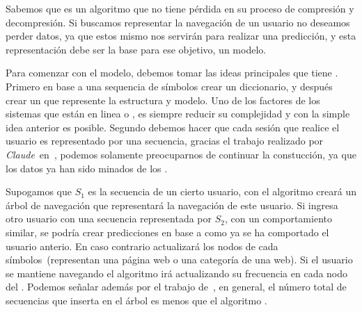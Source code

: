 % 
% 




Sabemos que \lzSieteOcho es un algoritmo que no tiene pérdida en su proceso de compresión y decompresión. Si buscamos representar la navegación de un usuario no deseamos perder datos, ya que estos mismo nos servirán para realizar una predicción, y esta representación debe ser la base para ese objetivo, un modelo.

Para comenzar con el modelo, debemos tomar las ideas principales que tiene \lzSieteOcho. Primero en base a una sequencia de símbolos crear un diccionario, y después crear un \trie que represente la estructura y modelo. Uno de los factores de los sistemas que están en linea o \webs, es siempre reducir su complejidad y con la simple idea anterior es posible. Segundo debemos hacer que cada sesión que realice el usuario es representado por una secuencia, gracias el trabajo realizado por \emph{Claude}~\etal en~\cite{Claude2014}, podemos solamente preocuparnos de continuar la constucción, ya que los datos ya han sido minados de los \webasccesslog.



Supogamos que $S_{1}$ es la secuencia de un cierto usuario, con el  algoritmo \lzSieteOcho creará un árbol de navegación que representará la navegación de este usuario. Si ingresa otro usuario con una secuencia representada por $S_{2}$, con un comportamiento similar, se podría crear predicciones en base a como ya se ha comportado el usuario anterio. En caso contrario actualizará los nodos de cada símbolos~(representan una página web o una categoría de una web). Si el usuario se mantiene navegando el algoritmo irá actualizando su frecuencia en cada nodo del \trie. Podemos señalar además por el trabajo de~\cite{Begleiter2004}, en general, el número total de secuencias que inserta en el árbol es menos que el algoritmo \PPM.  





